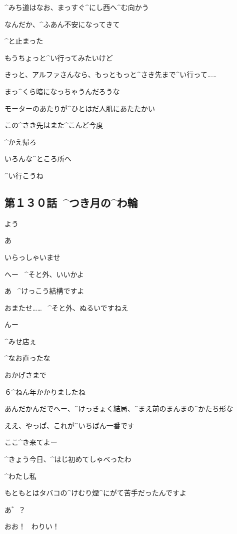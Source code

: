 \Kokone ^{みち}{道}はなお、まっすぐ^{にし}{西}へ^{む}{向}かう

\page[143]
\Kokone なんだか、^{ふあん}{不安}になってきて

\Kokone ^{と}{止}まった

\Kokone もうちょっと^{い}{行}ってみたいけど

\page
\Kokone きっと、アルファさんなら、もっともっと^{さき}{先}まで^{い}{行}って……

\Kokone まっ^{くら}{暗}になっちゃうんだろうな

\Kokone モーターのあたりが^{ひとはだ}{人肌}にあたたかい

\page
\Kokone この^{さき}{先}はまた^{こんど}{今度}

\Kokone ^{かえ}{帰}ろ

\page
\Kokone いろんな^{ところ}{所}へ

\Kokone ^{い}{行}こうね


\subsection{第１３０話\ ^{つき}{月}の^{わ}{輪}}

\page[148]
\Ojisan よう

\Alpha あ

\Alpha いらっしゃいませ

\page
\Ojisan へー
\ ^{そと}{外}、いいかよ

\Alpha あ
\ ^{けっこう}{結構}ですよ

\page
\Alpha おまたせ……
\ ^{そと}{外}、ぬるいですねえ

\Ojisan んー

\page
\Ojisan ^{みせ}{店}ぇ

\Ojisan ^{なお}{直}ったな

\Alpha おかげさまで

\Alpha ６^{ねん}{年}かかりましたね

\Ojisan あんだかんだでへー、^{けっきょく}{結局}、^{まえ}{前}のまんまの^{かたち}{形}な

\Alpha ええ、やっぱ、これが^{いちばん}{一番}です

\page
\Ojisan ここ^{き}{来}てよー

\Ojisan ^{きょう}{今日}、^{はじ}{初}めてしゃべったわ

\page
\Alpha ^{わたし}{私}

\Alpha もともとはタバコの^{けむり}{煙}^{にがて}{苦手}だったんですよ

\Ojisan あ゛？

\Ojisan おお！
\ わりい！

